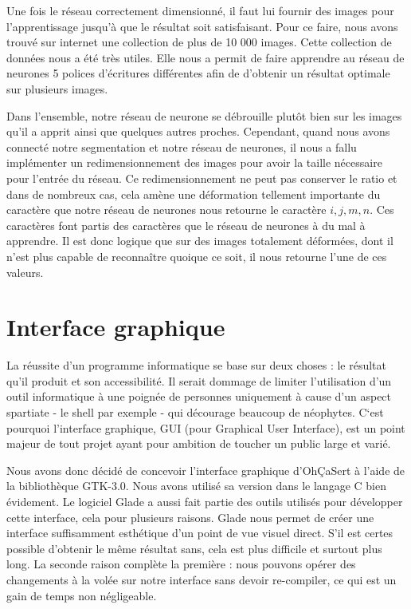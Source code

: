\documentclass[11pt]{report}
\begin{document}
Une fois le réseau correctement dimensionné, il faut lui fournir des images pour l'apprentissage jusqu'à que le résultat soit satisfaisant. Pour ce faire, nous avons trouvé sur internet une collection de plus de 10 000 images. Cette collection de données nous a été très utiles. Elle nous a permit de faire apprendre au réseau de neurones 5 polices d'écritures différentes afin de d'obtenir un résultat optimale sur plusieurs images.

Dans l'ensemble, notre réseau de neurone se débrouille plutôt bien sur les images qu'il a apprit ainsi que quelques autres proches. Cependant, quand nous avons connecté notre segmentation et notre réseau de neurones, il nous a fallu implémenter un redimensionnement des images pour avoir la taille nécessaire pour l'entrée du réseau. Ce redimensionnement ne peut pas conserver le ratio et dans de nombreux cas, cela amène une déformation tellement importante du caractère que notre réseau de neurones nous retourne le caractère $i, j,m, n$. Ces caractères font partis des caractères que le réseau de neurones à du mal à apprendre. Il est donc logique que sur des images totalement déformées, dont il n'est plus capable de reconnaître quoique ce soit, il nous retourne l'une de ces valeurs. 

\chapter{Interface graphique}

La réussite d’un programme informatique se base sur deux choses : le résultat qu’il produit et son accessibilité. Il serait dommage de limiter l’utilisation d’un outil informatique à une poignée de personnes uniquement à cause d’un aspect spartiate - le shell par exemple - qui décourage beaucoup de néophytes. C‘est pourquoi l’interface graphique, GUI (pour Graphical User Interface), est un point majeur de tout projet ayant pour ambition de toucher un public large et varié.

Nous avons donc décidé de concevoir l’interface graphique d’OhÇaSert à l’aide de la bibliothèque GTK-3.0. Nous avons utilisé sa version dans le langage C bien évidement. Le logiciel Glade a aussi fait partie des outils utilisés pour développer cette interface, cela pour plusieurs raisons. Glade nous permet de créer une interface suffisamment esthétique d’un point de vue visuel direct. S’il est certes possible d’obtenir le même résultat sans, cela est plus difficile et surtout plus long. La seconde raison complète la première : nous pouvons opérer des changements à la volée sur notre interface sans devoir re-compiler, ce qui est un gain de temps non négligeable.
\end{document}
